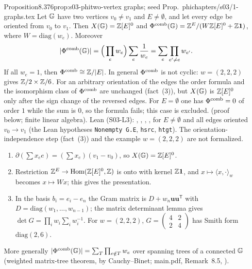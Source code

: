 \begin{quoted}{Proposition}{8.3}{76}{prop:s03-phi}{two-vertex graphs; seed Prop.~phi}{chapters/s03/1-graphs.tex}\label{rpt:prop:s03-phi}
Let $\mathbb{G}$ have two vertices $v_0\ne v_1$ and $E\ne\emptyset$, and let every edge be oriented from $v_0$ to $v_1$. Then $X(\mathbb{G})=\mathbb{Z}[E]^0$ and $\Phi^{\mathrm{comb}}(\mathbb{G})=\mathbb{Z}^E/(W\mathbb{Z}[E]^0+\mathbb{Z}\mathbf1)$, where
$W=\mathrm{diag}(w_e)$. Moreover
\[|\Phi^{\mathrm{comb}}(\mathbb{G})|=\Big(\prod_ew_e\Big)\sum_e\frac1{w_e}=\sum_e\prod_{e'\ne e}w_{e'}.\]
If all $w_e=1$, then $\Phi^{\mathrm{comb}}\cong\mathbb{Z}/|E|$. In general $\Phi^{\mathrm{comb}}$ is not cyclic: $w=(2,2,2)$ gives $\mathbb{Z}/2\times\mathbb{Z}/6$.
For an arbitrary orientation of the edges the order formula and the isomorphism class of $\Phi^{\mathrm{comb}}$ are unchanged (fact~(3)), but $X(\mathbb{G})$ is
$\mathbb{Z}[E]^0$ only after the sign change of the reversed edges. For $E=\emptyset$ one has $\Phi^{\mathrm{comb}}=0$ of order $1$ while the sum is $0$, so the
formula fails; this case is excluded.
\stproved{} (proof below; finite linear algebra). Lean (S03-L3): ,
, ,
 \stformal{}, for $E\ne\emptyset$ and all edges oriented $v_0\to v_1$ (the Lean hypotheses
\texttt{Nonempty G.E}, \texttt{hsrc}, \texttt{htgt}). The orientation-independence step (fact~(3)) and the example $w=(2,2,2)$ are not formalized.
\end{quoted}
\begin{outline}
\begin{enumerate}[label=(\arabic*)]
\item $\partial(\sum x_ee)=(\sum x_e)(v_1-v_0)$, so $X(\mathbb{G})=\mathbb{Z}[E]^0$. \stproved
\item Restriction $\mathbb{Z}^E\to\operatorname{Hom}(\mathbb{Z}[E]^0,\mathbb{Z})$ is onto with kernel $\mathbb{Z}\mathbf1$, and $x\mapsto\langle x,\cdot\rangle_w$ becomes $x\mapsto Wx$; this gives the
  presentation. \stproved
\item In the basis $b_i=e_i-e_n$ the Gram matrix is $D+w_n\mathbf u\mathbf u^{\mathsf T}$ with $D=\mathrm{diag}(w_1,\dots,w_{n-1})$; the matrix
  determinant lemma gives $\det G=\prod_iw_i\sum_iw_i^{-1}$. For $w=(2,2,2)$, $G=\left(\begin{smallmatrix}4&2\\2&4\end{smallmatrix}\right)$ has Smith form $\mathrm{diag}(2,6)$. \stproved
\end{enumerate}
More generally $|\Phi^{\mathrm{comb}}(\mathbb{G})|=\sum_T\prod_{e\notin T}w_e$ over spanning trees of a connected $\mathbb{G}$ (weighted matrix-tree theorem, by Cauchy--Binet;
main.pdf, Remark~8.5, \stproved).
\end{outline}

